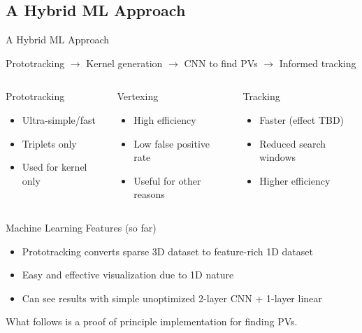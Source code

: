 \subsection{A Hybrid ML Approach}
\begin{frame}{A Hybrid ML Approach}
\begin{center}
Prototracking $\rightarrow$ Kernel generation $\rightarrow$ CNN to find PVs $\rightarrow$ Informed tracking
\end{center}

\begin{columns}[b]
    \begin{block}{Prototracking}
    \begin{itemize}
        \item Ultra-simple/fast
        \item Triplets only
        \item Used for kernel only
        \end{itemize}
    \end{block}
    \begin{block}{Vertexing}
    \begin{itemize}
        \item High efficiency
        \item Low false positive rate
        \item Useful for other reasons
        \end{itemize}
    \end{block}
    \begin{block}{Tracking}
    \begin{itemize}
        \item Faster (effect TBD)
        \item Reduced search windows
        \item Higher efficiency
    \end{itemize}
    \end{block}
\end{columns}
    \begin{block}{Machine Learning Features (so far)}
        \begin{itemize}
            \item Prototracking converts sparse 3D dataset to feature-rich 1D dataset
            \item Easy and effective visualization due to 1D nature
            \item Can see results with simple unoptimized 2-layer CNN + 1-layer linear
        \end{itemize}
    \end{block}

\vspace{.3em}
\begin{center}
What follows is a proof of principle implementation for finding PVs.
\end{center}
\end{frame}

